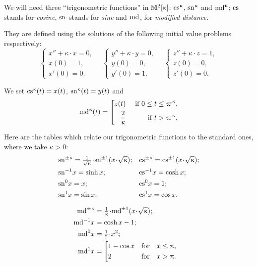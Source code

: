 We will need three ``trigonometric functions'' in $\mathbb{M}_{{}}^{2}[{\upkappa}]$: $\cs\kappa$, $\sn\kappa$ and $\md\kappa$;
$\mathrm{cs}^{}$ stands for \emph{cosine}, $\mathrm{sn}^{}$ stands for \emph{sine} and $\mathrm{md}^{}$, for \emph{modified distance}. 

They are defined using the solutions of the following initial value problems respectively:
\[
\begin{cases}
 x''+\kappa\cdot x=0,\\
 x(0)=1,\\
 x'(0)=0.
 \end{cases} 
  \quad 
 \begin{cases}
 y''+\kappa\cdot y=0,\\
 y(0)=0,\\
 y'(0)=1.
 \end{cases} 
\quad
 \begin{cases}
 z''+\kappa\cdot z=1,\\
 z(0)=0,\\
 z'(0)=0.
 \end{cases}  
\]

We set $\mathrm{cs}^{\upkappa}(t)=x(t)$, $\mathrm{sn}^{\upkappa}(t)=y(t)$ and 
\[
\md\kappa(t)=
\left[
\begin{aligned}
z(t)&& \textrm{ if } 0\le t\le \varpi\kappa,
\\
\frac{2}{\kappa}&& \textrm{ if  } t> \varpi\kappa.
\end{aligned}
\right.
\]

Here are the tables which relate our trigonometric functions to the standard ones, where 
we take $\kappa>0$:\index{$\md\kappa$}\index{$\sn\kappa$}\index{$\cs\kappa$}
\begin{align*}
&\sn{\pm\kappa}=\tfrac{1}{\sqrt{\kappa}}\cdot \sn{\pm1}({x}\cdot {\sqrt{\kappa}});
&&\cs{\pm\kappa}=\cs{\pm1}({x}\cdot {\sqrt{\kappa}});
\\
&\sn{-1} x=\sinh x;&&\cs{-1} x=\cosh x;\\
&\sn{0} x=x;
&&\cs{0} x=1;\\
&\sn{1} x=\sin x;	&&\cs{1} x= \cos x.
\end{align*}
	
\begin{align*}
\md{\pm\kappa}
&=
\tfrac{1}{\kappa}\cdot \md{\pm1}({x}\cdot {\sqrt{\kappa}});
\\
\md{-1} x&=\cosh x-1;
\\
\md{0} x&=\tfrac{1}{2}\cdot x^2; 
\\
\md{1} x
&=
\left[
\begin{aligned}
&1-\cos x&&\t{for}&&x\le \pi,
\\
&2&&\t{for}&&x >\pi.
\end{aligned}
\right.	&
\end{align*}


